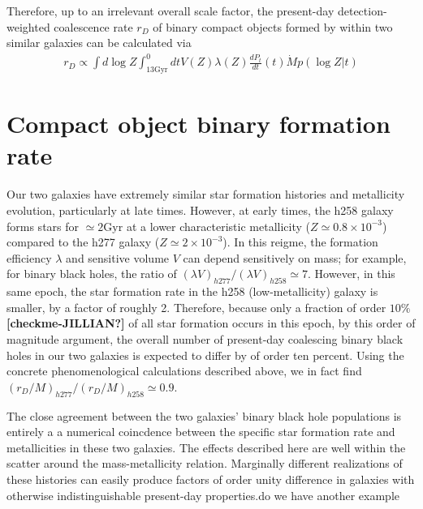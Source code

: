 \documentclass[nofootinbib,twocolumn,prd]{emulateapj}
\newcommand\editremark[1]{{\color{red}#1}}
\newcommand\unit[1]{\text{#1}}
\newcommand\ExcitingGalaxy{h258}
\newcommand\BoringGalaxy{h277}
\begin{document}
Therefore, up to an irrelevant overall scale factor, the  present-day detection-weighted coalescence rate $r_D$  of binary compact objects formed by within two similar
galaxies  can be calculated via
\begin{eqnarray}
 r_D \propto  \int d\log Z  \int _{13 \unit{Gyr}}^0dt  V(Z) \lambda(Z) \frac{dP_t}{dt}(t) \dot{M} p(\log Z|t)
\end{eqnarray}


\section{Compact object binary formation rate}
\label{sec:results:BBH}


 Our two galaxies have extremely similar star formation histories and metallicity evolution, particularly at late
 times.  
However, at early times, the \ExcitingGalaxy{} galaxy forms stars for $\simeq 2\unit{Gyr}$ at a lower characteristic metallicity
($Z\simeq 0.8 \times10^{-3}$) compared
to the \BoringGalaxy{} galaxy ($Z\simeq 2\times 10^{-3}$).  In this reigme, the formation efficiency $\lambda$ and sensitive volume $V$
can depend sensitively on mass; for example, for binary black holes, the ratio of  $(\lambda V)_{\BoringGalaxy{}}/(\lambda
V)_{\ExcitingGalaxy{}} \simeq 7$.    However, in this same epoch, the star formation rate in the \ExcitingGalaxy{} (low-metallicity)
galaxy is smaller, by a factor of roughly 2.
Therefore, because only a fraction of order $10\%$ \textbf{[checkme-JILLIAN?]} of all star formation occurs in this epoch, by this order of magnitude
argument, the overall number of
present-day coalescing binary black holes in our two galaxies is expected to differ by of order ten percent.
%
Using the concrete phenomenological calculations described above, we in fact find
$(r_{D}/M)_{\BoringGalaxy{}}/(r_{D}/M)_{\ExcitingGalaxy{}}\simeq 0.9$.    

The close agreement between the two galaxies' binary black hole populations  is entirely a
a numerical coincdence between the specific star formation rate and metallicities in these two galaxies.  The effects described here
  are well within the scatter around the mass-metallicity relation.  Marginally different realizations of these
  histories can easily produce factors of order unity difference in galaxies with otherwise indistinguishable
  present-day properties.\editremark{do we have another example}
\end{document}
